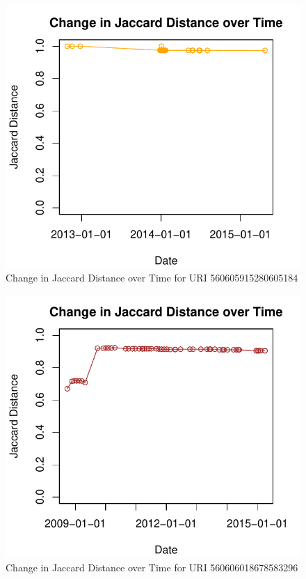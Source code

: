 \documentclass[a4paper,12pt]{article}
\begin{document}
\begin{figure}[H]
    \centering
    \includegraphics{stats/q3/560605915280605184.pdf}
    \caption{Change in Jaccard Distance over Time for URI 560605915280605184}
\end{figure}

\begin{figure}[H]
    \centering
    \includegraphics{stats/q3/560606018678583296.pdf}
    \caption{Change in Jaccard Distance over Time for URI 560606018678583296}
\end{figure}
\end{document}
